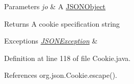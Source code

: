 \begin{DoxyParams}{Parameters}
{\em jo} & A \hyperlink{classorg_1_1json_1_1_j_s_o_n_object}{J\-S\-O\-N\-Object} \\
\hline
\end{DoxyParams}
\begin{DoxyReturn}{Returns}
A cookie specification string 
\end{DoxyReturn}

\begin{DoxyExceptions}{Exceptions}
{\em \hyperlink{classorg_1_1json_1_1_j_s_o_n_exception}{J\-S\-O\-N\-Exception}} & \\
\hline
\end{DoxyExceptions}


Definition at line 118 of file Cookie.\-java.



References org.\-json.\-Cookie.\-escape().


